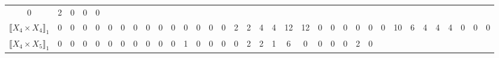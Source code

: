 \documentclass[12pt]{article}
\theoremstyle{definition}
\theoremstyle{remark}
\begin{document}
{\begin{table}[H]
\begin{adjustbox}{angle=90}
{\begin{tabular}{c||c|c|c|c|c|c|c|c|c|c|c|c|c|c|c|c|c|c|c|c|c|c|c|c|c|c|c|c|c|c|c|c|c|c}
0  & %
2  & %
0  & %
0  & %
0   %
\\
$\llbracket X_4 \times X_4 \rrbracket_1$ &
0  & %
0  & %
0  & %
0  & %
0  & %
0  & %
0  & %
0  & %
0  & %
0  & %
0  & %
0  & %
0  & %
0  & %
2  & %
2  & %
4  & %
4  & %
12  & %
12  & %
0  & %
0  & %
0  & %
0  & %
0  & %
0  & %
10  & %
6  & %
4  & %
4  & %
4  & %
0  & %
0  & %
0   %
\\
$\llbracket X_4 \times X_5 \rrbracket_1$ &
0  & %
0  & %
0  & %
0  & %
0  & %
0  & %
0  & %
0  & %
0  & %
0  & %
1  & %
0  & %
0  & %
0  & %
0  & %
2  & %
2  & %
1  & %
6  & %
0  & %
0  & %
0  & %
0  & %
2  & %
0  & %

\end{tabular}}
\end{adjustbox}
\end{table}}
\end{document}
